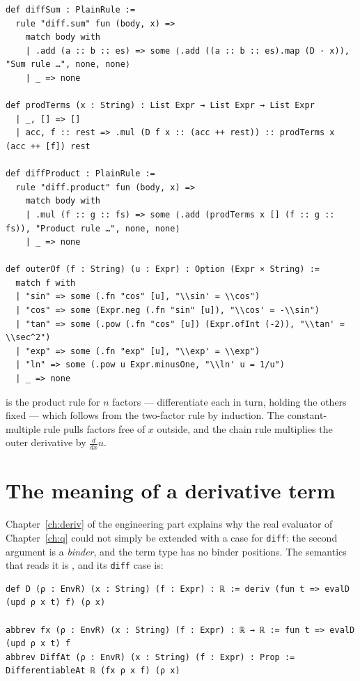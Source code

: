 \begin{verbatim}
def diffSum : PlainRule :=
  rule "diff.sum" fun (body, x) =>
    match body with
    | .add (a :: b :: es) => some ⟨.add ((a :: b :: es).map (D · x)), "Sum rule …", none, none⟩
    | _ => none

def prodTerms (x : String) : List Expr → List Expr → List Expr
  | _, [] => []
  | acc, f :: rest => .mul (D f x :: (acc ++ rest)) :: prodTerms x (acc ++ [f]) rest

def diffProduct : PlainRule :=
  rule "diff.product" fun (body, x) =>
    match body with
    | .mul (f :: g :: fs) => some ⟨.add (prodTerms x [] (f :: g :: fs)), "Product rule …", none, none⟩
    | _ => none

def outerOf (f : String) (u : Expr) : Option (Expr × String) :=
  match f with
  | "sin" => some (.fn "cos" [u], "\\sin' = \\cos")
  | "cos" => some (Expr.neg (.fn "sin" [u]), "\\cos' = -\\sin")
  | "tan" => some (.pow (.fn "cos" [u]) (Expr.ofInt (-2)), "\\tan' = \\sec^2")
  | "exp" => some (.fn "exp" [u], "\\exp' = \\exp")
  | "ln" => some (.pow u Expr.minusOne, "\\ln' u = 1/u")
  | _ => none
\end{verbatim}

 is the product rule for $n$ factors --- differentiate each in turn, holding the
others fixed --- which follows from the two-factor rule by induction. The constant-multiple rule
pulls factors free of $x$ outside, and the chain rule multiplies the outer derivative by
$\frac{d}{dx} u$.

\section{The meaning of a derivative term}

Chapter~\ref{ch:deriv} of the engineering part explains why the real evaluator of
Chapter~\ref{ch:q} could not simply be extended with a case for \texttt{diff}: the second
argument is a \emph{binder}, and the term type has no binder positions. The semantics that
reads it is , and its \texttt{diff} case is:

\begin{verbatim}
def D (ρ : EnvR) (x : String) (f : Expr) : ℝ := deriv (fun t => evalD (upd ρ x t) f) (ρ x)

abbrev fx (ρ : EnvR) (x : String) (f : Expr) : ℝ → ℝ := fun t => evalD (upd ρ x t) f
abbrev DiffAt (ρ : EnvR) (x : String) (f : Expr) : Prop := DifferentiableAt ℝ (fx ρ x f) (ρ x)
\end{verbatim}

